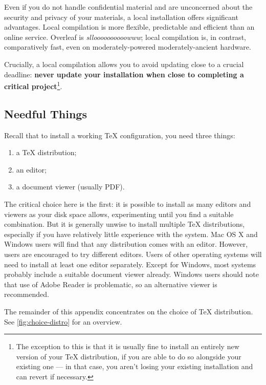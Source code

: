 Even if you do not handle confidential material and are unconcerned about the security and privacy of your materials, a local installation offers significant advantages.
Local compilation is more flexible, predictable and efficient than an online service.
Overleaf is \emph{slloooooooooowww}; local compilation is, in contrast, comparatively fast, even on moderately-powered moderately-ancient hardware.

Crucially, a local compilation allows you to avoid updating close to a crucial deadline: \textbf{never update your installation when close to completing a critical project}\footnote{%
  The exception to this is that it is usually fine to install an entirely new version of your \TeX{} distribution, if you are able to do so alongside your existing one --- in that case, you aren't losing your existing installation and can revert if necessary.}.

\subsection<1-| beamer:0>{Needful Things}\label{subsec:needful}

Recall that to install a working \TeX{} configuration, you need three things:
\begin{enumerate}
  \item a \TeX{} distribution;
  \item an editor;
  \item a document viewer (usually PDF).
\end{enumerate}
The critical choice here is the first: it is possible to install as many editors and viewers as your disk space allows, experimenting until you find a suitable combination.
But it is generally unwise to install multiple \TeX{} distributions, especially if you have relatively little experience with the system.
Mac OS X and Windows users will find that any distribution comes with an editor.
However, users are encouraged to try different editors.
Users of other operating systems will need to install at least one editor separately.
Except for Windows, most systems probably include a suitable document viewer already.
Windows users should note that use of Adobe Reader is problematic, so an alternative viewer is recommended.
\bigskip

The remainder of this appendix concentrates on the choice of \TeX{} distribution.
See \cref{fig:choice-distro} for an overview.

